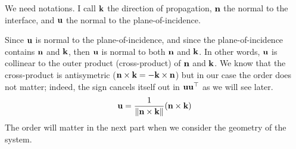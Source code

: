 We need notations.
I call $\textbf{k}$ the direction of propagation, $\textbf{n}$ the normal to the interface, and $\textbf{u}$ the normal to the plane-of-incidence.

Since $\textbf{u}$ is normal to the plane-of-incidence, and since the plane-of-incidence contains $\textbf{n}$ and $\textbf{k}$, then $\textbf{u}$ is normal to both $\textbf{n}$ and $\textbf{k}$.
In other words, $\textbf{u}$ is collinear to the outer product (cross-product) of $\textbf{n}$ and $\textbf{k}$.
We know that the cross-product is antisymetric
($\textbf{n} \times \textbf{k} = \mathord{-} \textbf{k} \times \textbf{n}$)
but in our case the order does not matter;
indeed, the sign cancels itself out in $\textbf{u} \textbf{u}^\top$ as we will see later.
\begin{equation}
    \textbf{u} = \frac{1}{\left\| \textbf{n} \times \textbf{k} \right\|} (\textbf{n} \times \textbf{k})  \label{eq:normal_to_plane_of_incidence}
\end{equation}
The order will matter in the next part when we consider the geometry of the system. 

